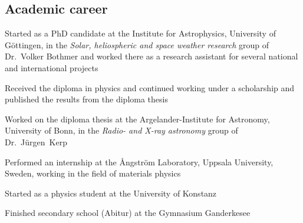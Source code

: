 \subsection*{Academic career}
\begin{description}[itemsep=3ex, leftmargin=1.5cm, style=sameline, align=parleft]
	\item[2012] Started as a PhD candidate at the Institute for Astrophysics, University of Göttingen, in the \textit{Solar, heliospheric and space weather research} group of Dr.~Volker Bothmer and worked there as a research assistant for several national and international projects
	\item[2011] Received the diploma in physics and continued working under a scholarship and published the results from the diploma thesis
	\item[2010] Worked on the diploma thesis at the Argelander-Institute for Astronomy, University of Bonn, in the \textit{Radio- and X-ray astronomy} group of Dr.~Jürgen~Kerp
	\item[2008] Performed an internship at the \AA{}ngström Laboratory, Uppsala University, Sweden, working in the field of materials physics
	\item[2004] Started as a physics student at the University of Konstanz
	\item[2003] Finished secondary school (Abitur) at the Gymnasium Ganderkesee
\end{description}

